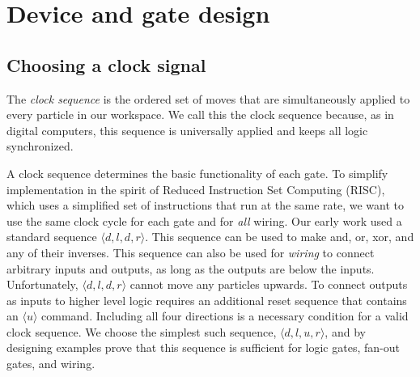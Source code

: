 \documentclass[letterpaper, 10 pt, conference]{ieeeconf}
\begin{document}
  \section{Device and gate design}
  
  \subsection{Choosing a clock signal}

The \emph{clock sequence} is the ordered set of moves that are simultaneously applied to every particle in our workspace. We call this the clock sequence because, as in digital computers, this sequence is universally applied and keeps all logic synchronized.

A clock sequence determines the basic functionality of each gate.  To simplify implementation in the spirit of Reduced Instruction Set Computing (RISC), which uses a simplified set of instructions that run at the same rate, we want to use the same clock cycle for each gate and for \emph{all} wiring. 
Our early work used a standard sequence  $\langle d,l,d,r \rangle$.  This sequence can be used to make {\sc and, or, xor}, and any of their inverses.  This sequence can also be used for \emph{wiring} to connect arbitrary inputs and outputs, as long as the outputs are below the inputs.  Unfortunately, $\langle d,l,d,r \rangle$ cannot move any particles upwards. To connect outputs as inputs to higher level logic requires an additional reset sequence that contains an $\langle u \rangle$ command.  Including all four directions is a necessary condition for a valid clock sequence.  We choose the simplest such sequence, $\langle d,l,u,r \rangle$, and by designing examples prove that this sequence is sufficient for logic gates, {\sc fan-out} gates, and wiring.
\end{document}
